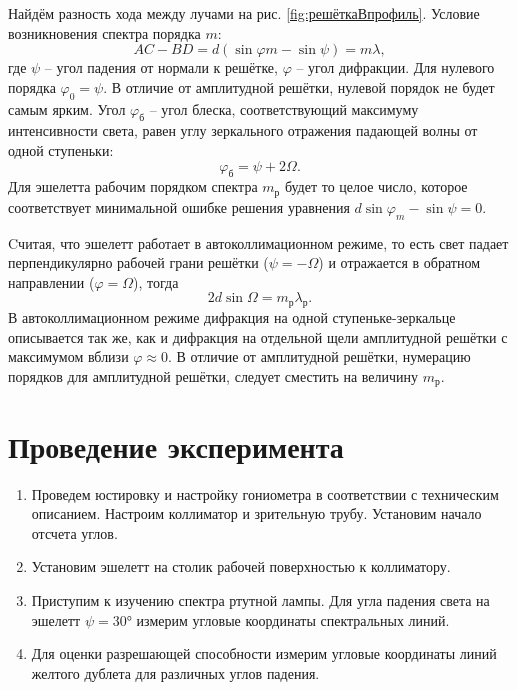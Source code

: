 \documentclass[14pt, a4paper]{report}
\begin{document}
Найдём разность хода между лучами на рис. \ref{fig:решёткаВпрофиль}. Условие возникновения спектра порядка $ m $:
\begin{equation}\label{eq:spectreM}
	A C - B D = d (\sin \varphi m- \sin \psi) = m \lambda,
\end{equation}
где $ \psi $ -- угол падения от нормали к решётке, $ \varphi $ -- угол дифракции.
Для нулевого порядка $ \varphi_0 = \psi $. В отличие от амплитудной решётки, нулевой порядок не будет самым ярким. Угол $ \varphi_б $ -- угол блеска, соответствующий максимуму интенсивности света, равен углу зеркального отражения падающей волны от одной ступеньки:
\begin{equation*}\label{key}
	\varphi_б = \psi+ 2 \Omega.
\end{equation*}
Для эшелетта рабочим порядком спектра $  m_р$ будет то целое число, которое соответствует минимальной ошибке решения уравнения $d \sin \varphi_m - \sin \psi = 0 $.

Cчитая, что эшелетт работает в автоколлимационном режиме, то есть свет падает перпендикулярно рабочей грани решётки ($ \psi = -\Omega $) и отражается в обратном направлении ($ \varphi = \Omega $), тогда
\begin{equation}\label{om}
	2 d \sin \Omega = m_р \lambda_р.
\end{equation}
В автоколлимационном режиме дифракция на одной ступеньке-зеркальце описывается так же, как и дифракция на отдельной щели амплитудной решётки с максимумом вблизи $ \varphi \approx 0 $. В отличие от амплитудной решётки, нумерацию порядков для амплитудной решётки, следует сместить на величину $ m_р $.

\section{Проведение эксперимента}

\begin{enumerate}

\setcounter{enumi}{0}

\item Проведем юстировку и настройку гониометра в соответствии с техническим описанием. Настроим коллиматор и зрительную трубу. Установим начало отсчета углов.

\item Установим эшелетт на столик рабочей поверхностью к коллиматору.

\item Приступим к изучению спектра ртутной лампы. Для угла падения света на эшелетт $\psi=\ang{30}$ измерим угловые координаты спектральных линий.

\item Для оценки разрешающей способности измерим угловые координаты линий желтого дублета для различных углов падения.

\end{enumerate}
\end{document}
